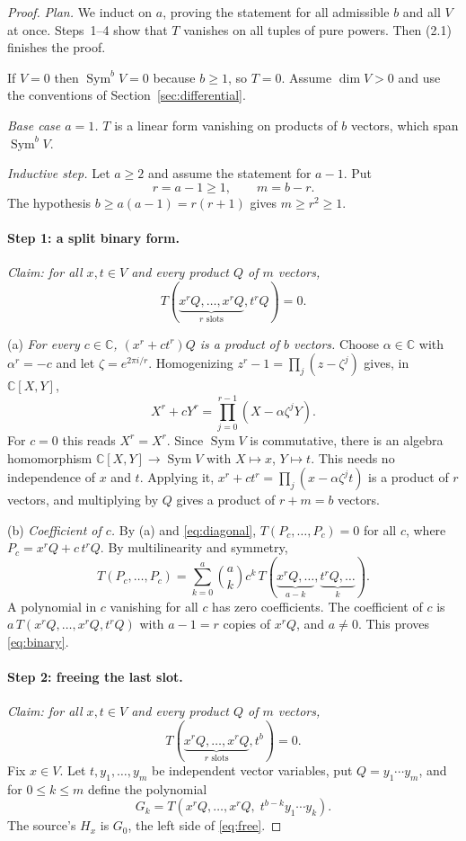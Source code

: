 \documentclass[11pt]{article}
\theoremstyle{remark}
\DeclareMathOperator{\Sym}{Sym}
\newcommand{\C}{\mathbb C}
\begin{document}
\begin{proof}
\emph{Plan.} We induct on $a$, proving the statement for all admissible $b$
and all $V$ at once. Steps~1--4 show that $T$ vanishes on all tuples of pure
powers. Then (2.1) finishes the proof.

If $V=0$ then $\Sym^bV=0$ because $b\ge1$, so $T=0$. Assume $\dim V>0$ and
use the conventions of Section~\ref{sec:differential}.

\emph{Base case $a=1$.} $T$ is a linear form vanishing on products of $b$
vectors, which span $\Sym^bV$.

\emph{Inductive step.} Let $a\ge2$ and assume the statement for $a-1$. Put
\[
 r=a-1\ge1,\qquad m=b-r .
\]
The hypothesis $b\ge a(a-1)=r(r+1)$ gives $m\ge r^2\ge1$.

\paragraph{Step 1: a split binary form.}
\emph{Claim: for all $x,t\in V$ and every product $Q$ of $m$ vectors,}
\begin{equation}\label{eq:binary}
 T(\underbrace{x^rQ,\ldots,x^rQ}_{r\text{ slots}},t^rQ)=0.
\end{equation}

(a) \emph{For every $c\in\C$, $(x^r+ct^r)Q$ is a product of $b$ vectors.}
Choose $\alpha\in\C$ with $\alpha^r=-c$ and let $\zeta=e^{2\pi i/r}$.
Homogenizing $z^r-1=\prod_j(z-\zeta^j)$ gives, in $\C[X,Y]$,
\[
 X^r+cY^r=\prod_{j=0}^{r-1}(X-\alpha\zeta^jY).
\]
For $c=0$ this reads $X^r=X^r$. Since $\Sym V$ is commutative, there is an
algebra homomorphism $\C[X,Y]\to\Sym V$ with $X\mapsto x$, $Y\mapsto t$.
This needs no independence of $x$ and $t$. Applying it,
$x^r+ct^r=\prod_j(x-\alpha\zeta^jt)$ is a product of $r$ vectors, and
multiplying by $Q$ gives a product of $r+m=b$ vectors.

(b) \emph{Coefficient of $c$.} By (a) and \eqref{eq:diagonal},
$T(P_c,\ldots,P_c)=0$ for all $c$, where $P_c=x^rQ+c\,t^rQ$. By
multilinearity and symmetry,
\[
 T(P_c,\ldots,P_c)=\sum_{k=0}^{a}\binom ak c^k\,
 T(\underbrace{x^rQ,\ldots}_{a-k},\underbrace{t^rQ,\ldots}_{k}).
\]
A polynomial in $c$ vanishing for all $c$ has zero coefficients. The
coefficient of $c$ is $a\,T(x^rQ,\ldots,x^rQ,t^rQ)$ with $a-1=r$ copies of
$x^rQ$, and $a\ne0$. This proves \eqref{eq:binary}.

\paragraph{Step 2: freeing the last slot.}
\emph{Claim: for all $x,t\in V$ and every product $Q$ of $m$ vectors,}
\begin{equation}\label{eq:free}
 T(\underbrace{x^rQ,\ldots,x^rQ}_{r\text{ slots}},t^b)=0.
\end{equation}
Fix $x\in V$. Let $t,y_1,\ldots,y_m$ be independent vector variables, put
$Q=y_1\cdots y_m$, and for $0\le k\le m$ define the polynomial
\[
 G_k=T(x^rQ,\ldots,x^rQ,\;t^{b-k}y_1\cdots y_k).
\]
The source's $H_x$ is $G_0$, the left side of \eqref{eq:free}.


\end{proof}
\end{document}
